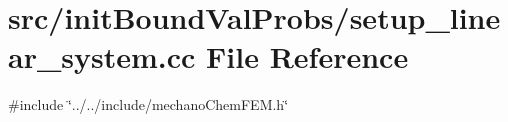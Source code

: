\section{src/init\+Bound\+Val\+Probs/setup\+\_\+linear\+\_\+system.cc File Reference}
\label{setup__linear__system_8cc}
{\ttfamily \#include \char`\"{}../../include/mechano\+Chem\+F\+E\+M.\+h\char`\"{}}\newline
